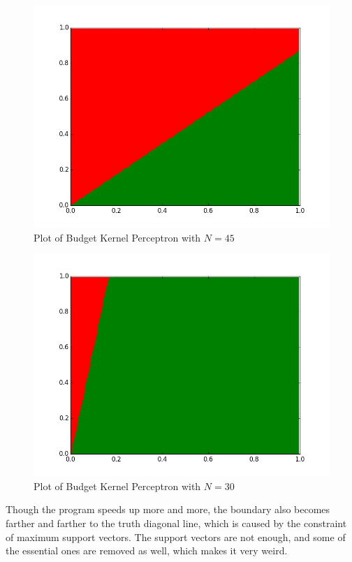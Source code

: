 \documentclass[submit]{harvardml}
\begin{document}
  \begin{figure}
     \centering
     \includegraphics[scale=0.3]{bk-N75.png}
     \caption{Plot of Budget Kernel Perceptron with $N=45$}
 \end{figure}
 
  \begin{figure}
     \centering
     \includegraphics[scale=0.3]{bk-N74.png}
     \caption{Plot of Budget Kernel Perceptron with $N=30$}
 \end{figure}

Though the program speeds up more and more, the boundary also becomes farther and farther to the truth diagonal line, which is caused by the constraint of maximum support vectors. The support vectors are not enough, and some of the essential ones are removed as well, which makes it very weird. 
\end{document}
